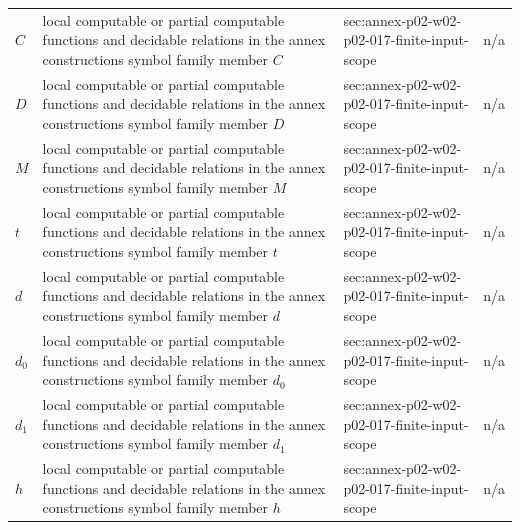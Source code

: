 \begin{longtable}{@{}p{}p{}p{}p{}@{}}
\(C\) & local computable or partial computable functions and decidable relations in the annex constructions symbol family member \(C\) & sec:\allowbreak{}annex-\allowbreak{}p02-\allowbreak{}w02-\allowbreak{}p02-\allowbreak{}017-\allowbreak{}finite-\allowbreak{}input-\allowbreak{}scope & n/a \\
\(D\) & local computable or partial computable functions and decidable relations in the annex constructions symbol family member \(D\) & sec:\allowbreak{}annex-\allowbreak{}p02-\allowbreak{}w02-\allowbreak{}p02-\allowbreak{}017-\allowbreak{}finite-\allowbreak{}input-\allowbreak{}scope & n/a \\
\(M\) & local computable or partial computable functions and decidable relations in the annex constructions symbol family member \(M\) & sec:\allowbreak{}annex-\allowbreak{}p02-\allowbreak{}w02-\allowbreak{}p02-\allowbreak{}017-\allowbreak{}finite-\allowbreak{}input-\allowbreak{}scope & n/a \\
\(t\) & local computable or partial computable functions and decidable relations in the annex constructions symbol family member \(t\) & sec:\allowbreak{}annex-\allowbreak{}p02-\allowbreak{}w02-\allowbreak{}p02-\allowbreak{}017-\allowbreak{}finite-\allowbreak{}input-\allowbreak{}scope & n/a \\
\(d\) & local computable or partial computable functions and decidable relations in the annex constructions symbol family member \(d\) & sec:\allowbreak{}annex-\allowbreak{}p02-\allowbreak{}w02-\allowbreak{}p02-\allowbreak{}017-\allowbreak{}finite-\allowbreak{}input-\allowbreak{}scope & n/a \\
\(d_0\) & local computable or partial computable functions and decidable relations in the annex constructions symbol family member \(d_0\) & sec:\allowbreak{}annex-\allowbreak{}p02-\allowbreak{}w02-\allowbreak{}p02-\allowbreak{}017-\allowbreak{}finite-\allowbreak{}input-\allowbreak{}scope & n/a \\
\(d_1\) & local computable or partial computable functions and decidable relations in the annex constructions symbol family member \(d_1\) & sec:\allowbreak{}annex-\allowbreak{}p02-\allowbreak{}w02-\allowbreak{}p02-\allowbreak{}017-\allowbreak{}finite-\allowbreak{}input-\allowbreak{}scope & n/a \\
\(h\) & local computable or partial computable functions and decidable relations in the annex constructions symbol family member \(h\) & sec:\allowbreak{}annex-\allowbreak{}p02-\allowbreak{}w02-\allowbreak{}p02-\allowbreak{}017-\allowbreak{}finite-\allowbreak{}input-\allowbreak{}scope & n/a \\

\end{longtable}
